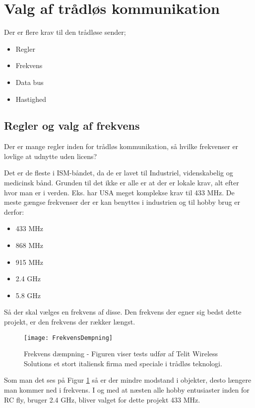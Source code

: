 \documentclass[Main]{subfiles}
\begin{document}
\section{Valg af trådløs kommunikation}

Der er flere krav til den trådløse sender;

\begin{itemize}
\item Regler
\item Frekvens
\item Data bus
\item Hastighed
\end{itemize}

\subsection{Regler og valg af frekvens}
Der er mange regler inden for trådløs kommunikation, så hvilke frekvenser er lovlige at udnytte uden licens?

Det er de fleste i ISM-båndet, da de er lavet til  Industriel, videnskabelig og medicinsk bånd. Grunden til det ikke er alle er at der er lokale krav, alt efter hvor man er i verden. Eks. har USA meget komplekse krav til 433 MHz\cite[s. 32]{Lov1}.
De meste gængse frekvenser der er kan benyttes i industrien og til hobby brug er derfor:

\begin{itemize}
\item 433 MHz
\item 868 MHz
\item 915 MHz
\item 2.4 GHz
\item 5.8 GHz
\end{itemize}

Så der skal vælges en frekvens af disse.
Den frekvens der egner sig bedst dette projekt, er den frekvens der rækker længst. 

\begin{figure}[H]
\centering
\texttt{[image: FrekvensDempning]}
\caption{Frekvens dæmpning - Figuren viser tests udfør af Telit Wireless Solutions\cite[s. 43]{Telit} et stort italiensk firma med speciale i trådløs teknologi.}
\label{Fig:dempning}
\end{figure}


Som man det ses på Figur \ref{Fig:dempning} så er der mindre modstand i objekter, desto længere man kommer ned i frekvens.
I og med at næsten alle hobby entusiaster inden for RC fly, bruger 2.4 GHz, bliver valget for dette projekt 433 MHz.
\end{document}
